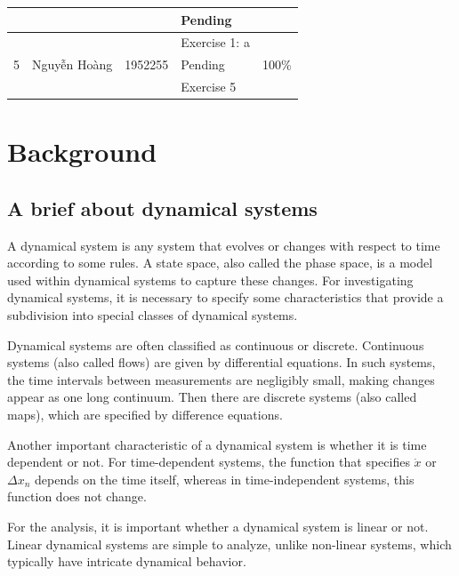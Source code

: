 \documentclass[a4paper]{article}
\begin{document}
\begin{center}
\begin{tabular}{|c|c|c|l|c|}
                       &                                        &                          & \textendash{} Pending          &                             \\
    \hline
    \multirow{3}{*}{5} & \multirow{3}{*}{Nguyễn Hoàng}          & \multirow{3}{*}{1952255} & \textendash{} Exercise 1: a    & \multirow{3}{*}{100\%}      \\
                       &                                        &                          & \textendash{} Pending          &                             \\
                       &                                        &                          & \textendash{} Exercise 5       &                             \\
    \hline
  \end{tabular}
\end{center}


\newpage
\section{Background}
\subsection{A brief about dynamical systems}
A dynamical system is any system that evolves or changes with respect to time according to some rules.
A state space, also called the phase space, is a model used within dynamical systems to capture these changes.
For investigating dynamical systems, it is necessary to specify some characteristics that provide a subdivision into special classes of dynamical systems.

Dynamical systems are often classified as continuous or discrete.
Continuous systems (also called flows) are given by differential equations.
In such systems, the time intervals between measurements are negligibly small, making changes appear as one long continuum.
Then there are discrete systems (also called maps), which are specified by difference equations.

Another important characteristic of a dynamical system is whether it is time dependent or not.
For time-dependent systems, the function that specifies \(\dot{x}\) or \(\Delta{x_n}\) depends on the time itself, whereas in time-independent systems, this function does not change.

For the analysis, it is important whether a dynamical system is linear or not.
Linear dynamical systems are simple to analyze, unlike non-linear systems, which typically have intricate dynamical behavior.
\end{document}
